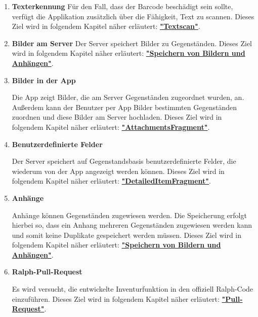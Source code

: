 \documentclass[
    headings=optiontotocandhead,%
    twoside,
    numbers=noenddot,%
    toc=flat, %
    12pt, %
    titlepage, %
    parskip=full, %
    listof=totoc, %
    listof=flat, %
    numbers=noenddot, %
    bibliography=totoc, %
    a4paper,DIV=14,
    BCOR=15mm,
]{scrbook}
\begin{document}
\begin{enumerate}
  \item \textbf{Texterkennung}
  Für den Fall, dass der Barcode beschädigt sein sollte, verfügt die Applikation zusätzlich über die Fähigkeit, Text zu scannen.  
  Dieses Ziel wird in folgendem Kapitel näher erläutert: \textbf{\hyperref[textscan]{"Textscan"}}.




  \item \textbf{Bilder am Server}
  Der Server speichert Bilder zu Gegenständen.  
  Dieses Ziel wird in folgendem Kapitel näher erläutert: \textbf{\hyperref[speichern-von-bildern-und-anhuxe4ngen]{"Speichern von Bildern und Anhängen"}}.



  \item \textbf{Bilder in der App}

  Die App zeigt Bilder, die am Server Gegenständen zugeordnet wurden, an. Außerdem kann der Benutzer per App Bilder bestimmten Gegenständen zuordnen und diese Bilder am Server hochladen.
  Dieses Ziel wird in folgendem Kapitel näher erläutert: \textbf{\hyperref[attachmentsfragment]{"AttachmentsFragment"}}.




  \item \textbf{Benutzerdefinierte Felder}

  Der Server speichert auf Gegenstandsbasis benutzerdefinierte Felder, die wiederum von der App angezeigt werden können.
  Dieses Ziel wird in folgendem Kapitel näher erläutert: \textbf{\hyperref[detaileditemfragment]{"DetailedItemFragment"}}.



  \item \textbf{Anhänge}

  Anhänge können Gegenständen zugewiesen werden. Die Speicherung erfolgt hierbei so, dass ein Anhang mehreren Gegenständen zugewiesen werden kann und somit keine Duplikate gespeichert werden müssen.
  Dieses Ziel wird in folgendem Kapitel näher erläutert: \textbf{\hyperref[speichern-von-bildern-und-anhuxe4ngen]{"Speichern von Bildern und Anhängen"}}.



  \item \textbf{Ralph-Pull-Request}

  Es wird versucht, die entwickelte Inventurfunktion in den offiziell Ralph-Code einzuführen. 
  Dieses Ziel wird in folgendem Kapitel näher erläutert: \textbf{\hyperref[pull-request]{"Pull-Request"}}.




\end{enumerate}
\end{document}
